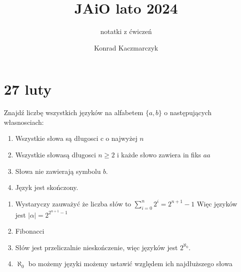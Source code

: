 \documentclass[11pt]{scrartcl}
\author{Konrad Kaczmarczyk}
\begin{document}
  \title{JAiO lato 2024}
  \subtitle{notatki z ćwiczeń}
  \maketitle
  \section{27 luty}
  \begin{zadanie}
      Znajdź liczbę wszystkich języków na alfabetem $\{ a, b \}$ o następujących własnosciach:
      \begin{enumerate}
          \item Wszystkie słowa są długosci c o najwyżej $n$
          \item Wszystkie słowasą długosci $n \geq 2 $ i każde słowo zawiera in fiks $aa$
          \item Słowa nie zawierają symbolu $b$.
          \item Język jest skończony.
      \end{enumerate}
  \end{zadanie}
  
  \begin{enumerate}
    \item Wystaryczy zauważyć że liczba słów to $\sum_{i = 0}^{n} 2^i = 2^{n+1} -1$
      Więc języków jest $\lvert \alpha \rvert = 2^{2^{n+1} - 1}$
    \item Fibonacci
    \item Słów jest przeliczalnie nieskończenie, więc języków jest $2^{\aleph_0}$.
    \item $\aleph_0$ bo możemy języki możemy ustawić względem ich najdłuższego słowa
  \end{enumerate}
\end{document}
